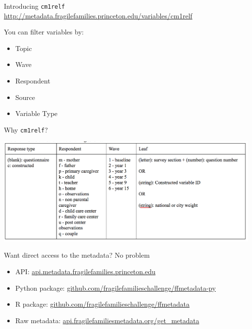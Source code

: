 \documentclass{beamer}
\begin{document}
\begin{frame}

Introducing \texttt{cm1relf}\\

\url{http://metadata.fragilefamilies.princeton.edu/variables/cm1relf}

\end{frame}
\begin{frame}

You can filter variables by:
\begin{itemize}
\item Topic
\item Wave
\item Respondent
\item Source
\item Variable Type
\end{itemize}

\end{frame}	
\begin{frame}

Why \texttt{cm1relf}? \pause

\begin{center}
\includegraphics[width=\textwidth]{figures/ff_variablename_standards}
\end{center}

\end{frame}
\begin{frame}

Want direct access to the metadata?  \pause No problem

\begin{itemize}
\item API: \url{api.metadata.fragilefamilies.princeton.edu}
\item Python package: \url{github.com/fragilefamilieschallenge/ffmetadata-py}
\item R package: \url{github.com/fragilefamilieschallenge/ffmetadata}
\item Raw metadata: \url{api.fragilefamiliesmetadata.org/get_metadata}
\end{itemize}

\end{frame}
\end{document}

